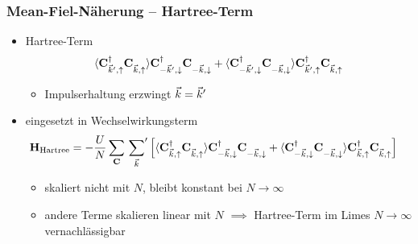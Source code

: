 \begin{frame}
    \frametitle{Mean-Fiel-Näherung -- Hartree-Term}
    \begin{itemize}
        \item Hartree-Term 
        \begin{align*}
            \expval{\ocdu \ocndu} \ocdd \ocndd + \expval{\ocdd \ocndd} \ocdu \ocndu
        \end{align*}
        \begin{itemize}
            \pause
            \item[$\rightarrow$] Impulserhaltung erzwingt ${\vec{k}} = {\vec{k}}'$ 
        \end{itemize}
        \pause
        \item eingesetzt in Wechselwirkungsterm 
        \begin{align*}
            \oH_\text{Hartree} &= -\frac{U}{N} \sum_\oC \sump{\vk} \left[\expval{\ocd{\vk, \up} \oc{\vk, \up}} \ocd{-\vk, \down} \ocndd + \expval{\ocd{-\vk, \down} \ocndd} \ocd{\vk, \up} \ocndu\right]
        \end{align*}
        \begin{itemize}
            \item[$\rightarrow$] skaliert nicht mit $N$, bleibt konstant bei $N \rightarrow \infty$
            \item[$\rightarrow$] andere Terme skalieren linear mit $N$ $\implies$ Hartree-Term im Limes $N \rightarrow \infty$ vernachlässigbar
        \end{itemize}
    \end{itemize}
\end{frame}

